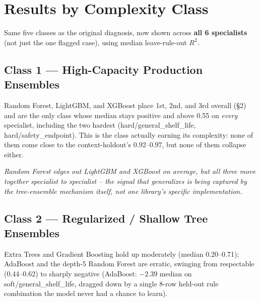 \documentclass[11pt]{article}
\begin{document}
\section{Results by Complexity Class}
Same five classes as the original diagnosis, now shown across
\textbf{all 6 specialists} (not just the one flagged case), using median
leave-rule-out $R^2$.

\subsection{Class 1 --- High-Capacity Production Ensembles}
Random Forest, LightGBM, and XGBoost place 1st, 2nd, and 3rd overall (\S2)
and are the only class whose median stays positive and above 0.55 on
\emph{every} specialist, including the two hardest (hard/general\_shelf\_life,
hard/safety\_endpoint). This is the class actually earning its complexity:
none of them come close to the context-holdout's 0.92--0.97, but none of
them collapse either.

\begin{center}
\end{center}
\vspace{-0.3em}
\textit{Random Forest edges out LightGBM and XGBoost on average, but all
three move together specialist to specialist -- the signal that
generalizes is being captured by the tree-ensemble mechanism itself, not
one library's specific implementation.}

\subsection{Class 2 --- Regularized / Shallow Tree Ensembles}
Extra Trees and Gradient Boosting hold up moderately (median 0.20--0.71);
AdaBoost and the depth-5 Random Forest are erratic, swinging from
respectable (0.44--0.62) to sharply negative (AdaBoost: $-2.39$ median on
soft/general\_shelf\_life, dragged down by a single 8-row held-out rule
combination the model never had a chance to learn).
\end{document}
